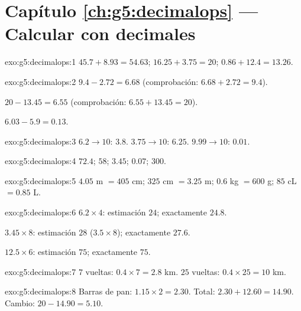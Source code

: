 \section*{Capítulo \ref{ch:g5:decimalops} --- Calcular con decimales}

\begin{solution}{exo:g5:decimalops:1}
$45.7 + 8.93 = 54.63$; \quad
$16.25 + 3.75 = 20$; \quad
$0.86 + 12.4 = 13.26$.
\end{solution}

\begin{solution}{exo:g5:decimalops:2}
$9.4 - 2.72 = 6.68$ (comprobación: $6.68 + 2.72 = 9.4$).

$20 - 13.45 = 6.55$ (comprobación: $6.55 + 13.45 = 20$).

$6.03 - 5.9 = 0.13$.
\end{solution}

\begin{solution}{exo:g5:decimalops:3}
$6.2 \to 10$: $3.8$. \quad $3.75 \to 10$: $6.25$. \quad
$9.99 \to 10$: $0.01$.
\end{solution}

\begin{solution}{exo:g5:decimalops:4}
$72.4$; \quad $58$; \quad $3.45$; \quad $0.07$; \quad $300$.
\end{solution}

\begin{solution}{exo:g5:decimalops:5}
$4.05$ m $= 405$ cm; \quad $325$ cm $= 3.25$ m; \quad
$0.6$ kg $= 600$ g; \quad $85$ cL $= 0.85$ L.
\end{solution}

\begin{solution}{exo:g5:decimalops:6}
$6.2 \times 4$: estimación $24$; exactamente $24.8$.

$3.45 \times 8$: estimación $28$ ($3.5 \times 8$); exactamente $27.6$.

$12.5 \times 6$: estimación $75$; exactamente $75$.
\end{solution}

\begin{solution}{exo:g5:decimalops:7}
$7$ vueltas: $0.4 \times 7 = 2.8$ km. $25$ vueltas:
$0.4 \times 25 = 10$ km.
\end{solution}

\begin{solution}{exo:g5:decimalops:8}
Barras de pan: $1.15 \times 2 = 2.30$. Total: $2.30 + 12.60 = 14.90$.
Cambio: $20 - 14.90 = 5.10$.
\end{solution}

